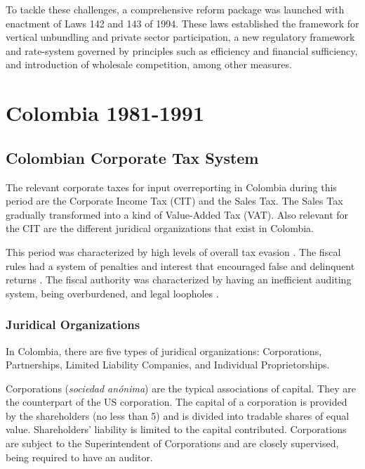 \documentclass[
  12pt]{article}
\theoremstyle{definition}
\theoremstyle{remark}
\begin{document}
To tackle these challenges, a comprehensive reform package was launched
with enactment of Laws 142 and 143 of 1994. These laws established the
framework for vertical unbundling and private sector participation, a
new regulatory framework and rate-system governed by principles such as
efficiency and financial sufficiency, and introduction of wholesale
competition, among other measures.

\section{Colombia 1981-1991}\label{colombia-1981-1991}

\subsection{Colombian Corporate Tax
System}\label{colombian-corporate-tax-system}

The relevant corporate taxes for input overreporting in Colombia during
this period are the Corporate Income Tax (CIT) and the Sales Tax. The
Sales Tax gradually transformed into a kind of Value-Added Tax (VAT).
Also relevant for the CIT are the different juridical organizations that
exist in Colombia.

This period was characterized by high levels of overall tax evasion
\citep{Sanchez1994}. The fiscal rules had a system of penalties and
interest that encouraged false and delinquent returns
\citep{McLure1989}. The fiscal authority was characterized by having an
inefficient auditing system, being overburdened, and legal loopholes
\citep{Perry1990}.

\subsubsection{Juridical Organizations}\label{juridical-organizations}

In Colombia, there are five types of juridical organizations:
Corporations, Partnerships, Limited Liability Companies, and Individual
Proprietorships.

Corporations (\emph{sociedad anónima}) are the typical associations of
capital. They are the counterpart of the US corporation. The capital of
a corporation is provided by the shareholders (no less than 5) and is
divided into tradable shares of equal value. Shareholders' liability is
limited to the capital contributed. Corporations are subject to the
Superintendent of Corporations and are closely supervised, being
required to have an auditor.
\end{document}
